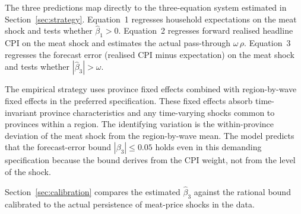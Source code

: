 The three predictions map directly to the three-equation system
estimated in Section~\ref{sec:strategy}.
Equation~1 regresses household expectations on the meat shock
and tests whether $\hat{\beta}_1 > 0$.
Equation~2 regresses forward realised headline CPI on the
meat shock and estimates the actual pass-through
$\omega\,\rho$.
Equation~3 regresses the forecast error
(realised CPI minus expectation) on the meat shock and tests
whether $|\hat{\beta}_3| > \omega$.

The empirical strategy uses province fixed effects combined
with region-by-wave fixed effects in the preferred specification.
These fixed effects absorb time-invariant province characteristics
and any time-varying shocks common to provinces within a region.
The identifying variation is the within-province deviation of the
meat shock from the region-by-wave mean.
The model predicts that the forecast-error bound
$|\beta_3| \leq 0.05$ holds even in this demanding
specification because the bound derives from the CPI weight,
not from the level of the shock.

Section~\ref{sec:calibration} compares the estimated
$\hat{\beta}_3$ against the rational bound calibrated
to the actual persistence of meat-price shocks in the data.

